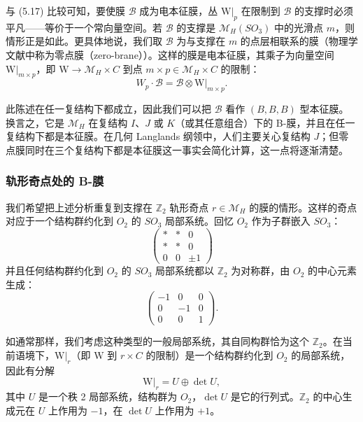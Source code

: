 与 (5.17) 比较可知，要使膜 $\mathcal{B}$ 成为电本征膜，丛 $\mathrm{W}|_p$ 在限制到 $\mathcal{B}$ 的支撑时必须平凡——等价于一个常向量空间。若 $\mathcal{B}$ 的支撑是 $\mathcal{M}_H(SO_3)$ 中的光滑点 $m$，则情形正是如此。更具体地说，我们取 $\mathcal{B}$ 为与支撑在 $m$ 的点层相联系的膜（物理学文献中称为零点膜（zero-brane））。这样的膜是电本征膜，其乘子为向量空间 $\mathrm{W}|_{m\times p}$，即
$\mathrm{W}\to\mathcal{M}_H\times C$ 到点 $m\times p\in\mathcal{M}_H\times C$ 的限制：
\begin{equation}\tag{5.19}
W_p\cdot\mathcal{B}=\mathcal{B}\otimes\mathrm{W}|_{m\times p}.
\end{equation}

此陈述在任一复结构下都成立，因此我们可以把 $\mathcal{B}$ 看作 $(B,B,B)$ 型本征膜。换言之，它是 $\mathcal{M}_H$ 在复结构 $I$、$J$ 或 $K$（或其任意组合）下的 B-膜，并且在任一复结构下都是本征膜。在几何 Langlands 纲领中，人们主要关心复结构 $J$；但零点膜同时在三个复结构下都是本征膜这一事实会简化计算，这一点将逐渐清楚。

\subsubsection{轨形奇点处的 B-膜}

我们希望把上述分析重复到支撑在 $\mathbb{Z}_2$ 轨形奇点 $r\in\mathcal{M}_H$ 的膜的情形。这样的奇点对应于一个结构群约化到 $O_2$ 的 $SO_3$ 局部系统。回忆 $O_2$ 作为子群嵌入 $SO_3$：
\begin{equation}\tag{5.20}
\begin{pmatrix}
* & * & 0\\
* & * & 0\\
0 & 0 & \pm 1
\end{pmatrix}
\end{equation}
并且任何结构群约化到 $O_2$ 的 $SO_3$ 局部系统都以 $\mathbb{Z}_2$ 为对称群，由 $O_2$ 的中心元素生成：
\begin{equation}\tag{5.21}
\begin{pmatrix}
-1 & 0 & 0\\
0 & -1 & 0\\
0 & 0 & 1
\end{pmatrix}.
\end{equation}

如通常那样，我们考虑这种类型的一般局部系统，其自同构群恰为这个 $\mathbb{Z}_2$。在当前语境下，$\mathrm{W}|_r$（即 $\mathrm{W}$ 到 $r\times C$ 的限制）是一个结构群约化到 $O_2$ 的局部系统，因此有分解
\begin{equation}\tag{5.22}
\mathrm{W}|_r=U\oplus\det U,
\end{equation}
其中 $U$ 是一个秩 2 局部系统，结构群为 $O_2$，$\det U$ 是它的行列式。$\mathbb{Z}_2$ 的中心生成元在 $U$ 上作用为 $-1$，在 $\det U$ 上作用为 $+1$。

